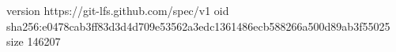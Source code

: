 version https://git-lfs.github.com/spec/v1
oid sha256:e0478cab3ff83d3d4d709e53562a3edc1361486ecb588266a500d89ab3f55025
size 146207
